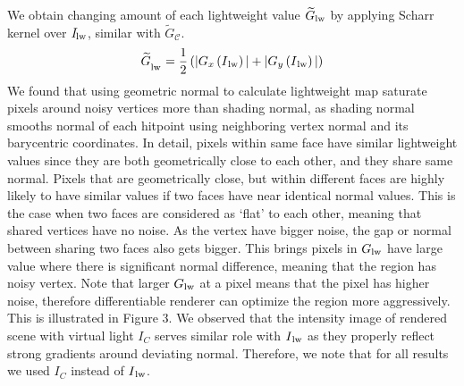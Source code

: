 We obtain changing amount of each lightweight value $\widetilde{G}\textsubscript{lw}$ by applying Scharr kernel over $\textit{I}\textsubscript{lw}$, similar with $\widetilde{G}_\mathcal{C}$.
\begin{equation}
    \widetilde{G}_\textsubscript{lw}=\frac{1}{2}\left(|G_x\left(I\textsubscript{lw}\right)|+|G_y\left(I\textsubscript{lw}\right)|\right)
\end{equation}
We found that using geometric normal to calculate lightweight map saturate pixels around noisy vertices more than shading normal, as shading normal smooths normal of each hitpoint using neighboring vertex normal and its barycentric coordinates. 
In detail, pixels within same face have similar lightweight values since they are both geometrically close to each other, and they share same normal. 
Pixels that are geometrically close, but within different faces are highly likely to have similar values if two faces have near identical normal values. 
This is the case when two faces are considered as ‘flat’ to each other, meaning that shared vertices have no noise. 
As the vertex have bigger noise, the gap or normal between sharing two faces also gets bigger. 
This brings pixels in $G\textsubscript{lw}$ have large value where there is significant normal difference, meaning that the region has noisy vertex. 
Note that larger $G\textsubscript{lw}$ at a pixel means that the pixel has higher noise, therefore differentiable renderer can optimize the region more aggressively. 
This is illustrated in Figure 3.
We observed that the intensity image of rendered scene with virtual light $I_C$ serves similar role with $I\textsubscript{lw}$ as they properly reflect strong gradients around deviating normal.
Therefore, we note that for all results we used $I_C$ instead of $I\textsubscript{lw}$.
